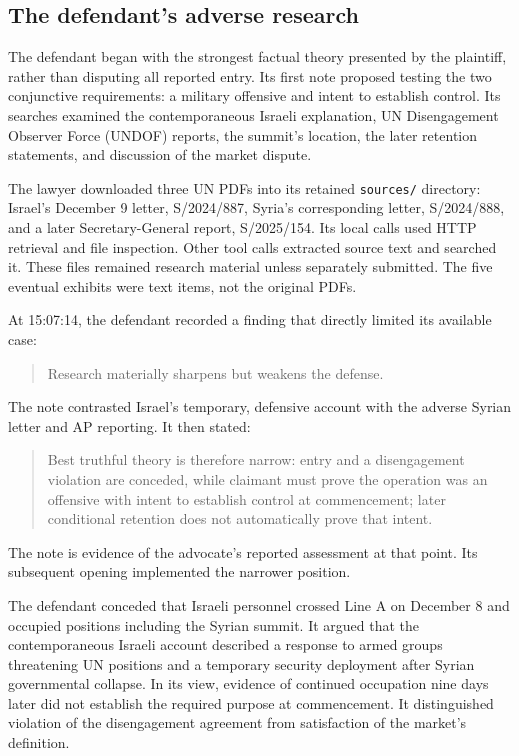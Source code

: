 \documentclass[11pt]{article}
\newcommand{\code}[1]{\texttt{#1}}
\begin{document}
\subsection{The defendant's adverse research}

The defendant began with the strongest factual theory presented by the plaintiff, rather than disputing all reported entry.  Its first note proposed testing the two conjunctive requirements: a military offensive and intent to establish control.  Its searches examined the contemporaneous Israeli explanation, UN Disengagement Observer Force (UNDOF) reports, the summit's location, the later retention statements, and discussion of the market dispute.

The lawyer downloaded three UN PDFs into its retained \code{sources/} directory: Israel's December 9 letter, S/2024/887, Syria's corresponding letter, S/2024/888, and a later Secretary-General report, S/2025/154.  Its local calls used HTTP retrieval and file inspection.  Other tool calls extracted source text and searched it.  These files remained research material unless separately submitted.  The five eventual exhibits were text items, not the original PDFs.

At 15:07:14, the defendant recorded a finding that directly limited its available case:
\begin{quote}
Research materially sharpens but weakens the defense.
\end{quote}
The note contrasted Israel's temporary, defensive account with the adverse Syrian letter and AP reporting.  It then stated:
\begin{quote}
Best truthful theory is therefore narrow: entry and a disengagement violation are conceded, while claimant must prove the operation was an offensive with intent to establish control at commencement; later conditional retention does not automatically prove that intent.
\end{quote}
The note is evidence of the advocate's reported assessment at that point.  Its subsequent opening implemented the narrower position.

The defendant conceded that Israeli personnel crossed Line A on December 8 and occupied positions including the Syrian summit.  It argued that the contemporaneous Israeli account described a response to armed groups threatening UN positions and a temporary security deployment after Syrian governmental collapse.  In its view, evidence of continued occupation nine days later did not establish the required purpose at commencement.  It distinguished violation of the disengagement agreement from satisfaction of the market's definition.
\end{document}
